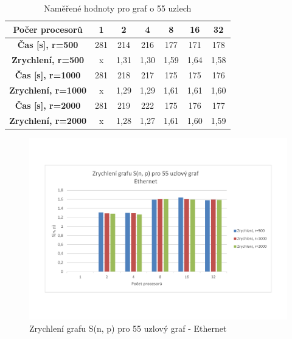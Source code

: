 \documentclass[11pt]{article}
\begin{document}
\begin{table}[h]
	\caption{Naměřené hodnoty pro graf o 55 uzlech}
	\label{tab:namereneHodnotyGraf55}
	\centering
	\begin{tabular}{| c || c | c | c | c | c | c |}
		\hline
		\textbf{Počer procesorů} & \textbf{1} & \textbf{2} & \textbf{4} & \textbf{8} & \textbf{16} & \textbf{32} \\
		\hline \hline
		\textbf{Čas [s], r=500} & 281 & 214 & 216 & 177 & 171 & 178 \\
		\hline
		\textbf{Zrychlení, r=500} & x & 1,31 & 1,30 & 1,59 & 1,64 & 1,58 \\
		\hline
		\textbf{Čas [s], r=1000} & 281 & 218 & 217 & 175 & 175 & 176 \\
		\hline
		\textbf{Zrychlení, r=1000} & x & 1,29 & 1,29 & 1,61 & 1,61 & 1,60 \\
		\hline
		\textbf{Čas [s], r=2000} & 281 & 219 & 222 & 175 & 176 & 177 \\
		\hline
		\textbf{Zrychlení, r=2000} & x & 1,28 & 1,27 & 1,61 & 1,60 & 1,59 \\
		\hline
	\end{tabular}
\end{table}

\begin{figure}[h]
  \centering
 	\caption{Zrychlení grafu S(n, p) pro 55 uzlový graf - Ethernet}
  	\includegraphics[width=15cm]{zrychleni55.pdf}
\end{figure}
\end{document}
